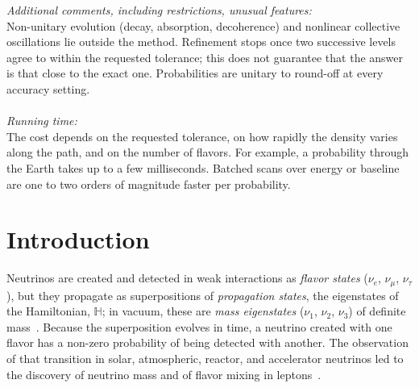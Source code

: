\documentclass[final,5p,times,twocolumn,sort,compress]{elsarticle}
\makeatletter
\DeclareRobustCommand{\_}{%
  \ifmmode\nfss@text{\textunderscore}\else\textunderscore\allowbreak\fi}
\makeatother
\begin{document}
\begin{small}
\smallskip
{\em Additional comments, including restrictions, unusual features:}\\
Non-unitary evolution (decay, absorption, decoherence) and nonlinear collective oscillations lie outside the method. Refinement stops once two successive levels agree to within the requested tolerance; this does not guarantee that the answer is that close to the exact one. Probabilities are unitary to round-off at every accuracy setting. \\ \\
{\em Running time:}\\
The cost depends on the requested tolerance, on how rapidly the density varies along the path, and on the number of flavors. For example, a probability through the Earth takes up to a few milliseconds. Batched scans over energy or baseline are one to two orders of magnitude faster per probability.
\end{small}


\setcounter{tocdepth}{3}
\tableofcontents


\section{Introduction}
\label{sec:introduction}

Neutrinos are created and detected in weak interactions as \textit{flavor states} ($\nu_e$, $\nu_\mu$, $\nu_\tau$), but they propagate as superpositions of \emph{propagation states}, the eigenstates of the Hamiltonian, $\mathbb{H}$; in vacuum, these are \textit{mass eigenstates} ($\nu_1$, $\nu_2$, $\nu_3$) of definite mass\ \cite{Pontecorvo:1967fh, Maki:1962mu, Bilenky:2004sn, Fantini:2018itu}. Because the superposition evolves in time, a neutrino created with one flavor has a non-zero probability of being detected with another. The observation of that transition in solar, atmospheric, reactor, and accelerator neutrinos led to the discovery of neutrino mass and of flavor mixing in leptons\ \cite{Kajita:2016cak, McDonald:2016ixn}.
\end{document}
